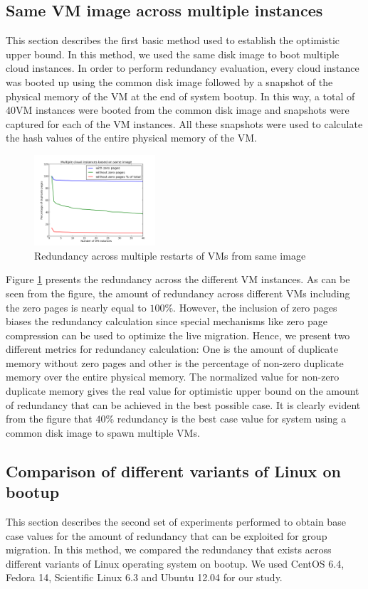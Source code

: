 \documentclass{acm_proc_article-sp}
\begin{document}
\subsection{Same VM image across multiple instances}
This section describes the first basic method used to establish the optimistic upper bound. In this method, we used the same disk image to boot multiple cloud instances. In order to perform redundancy evaluation, every cloud instance was booted up using the common disk image followed by a snapshot of the physical memory of the VM at the end of system bootup. In this way, a total of 40VM instances were booted from the common disk image and snapshots were captured for each of the VM instances. All these snapshots were used to calculate the hash values of the entire physical memory of the VM.

\begin{figure}
  \centering
  \includegraphics[width=0.4\textwidth]{images/samevm_multiplerestarts.png}
  \caption{Redundancy across multiple restarts of VMs from same image}\label{fig:multiple_restarts}
\end{figure}

Figure \ref{fig:multiple_restarts} presents the redundancy across the different VM instances. As can be seen from the figure, the amount of redundancy across different VMs including the zero pages is nearly equal to $100$\%. However, the inclusion of zero pages biases the redundancy calculation since special mechanisms like zero page compression can be used to optimize the live migration. Hence, we present two different metrics for redundancy calculation: One is the amount of duplicate memory without zero pages and other is the percentage of non-zero duplicate memory over the entire physical memory. The normalized value for non-zero duplicate memory gives the real value for optimistic upper bound on the amount of redundancy that can be achieved in the best possible case. It is clearly evident from the figure that $40$\% redundancy is the best case value for system using a common disk image to spawn multiple VMs. 


\subsection{Comparison of different variants of Linux on bootup}
This section describes the second set of experiments performed to obtain base case values for the amount of redundancy that can be exploited for group migration. In this method, we compared the redundancy that exists across different variants of Linux operating system on bootup. We used CentOS 6.4, Fedora 14, Scientific Linux 6.3 and Ubuntu 12.04 for our study.
\end{document}

